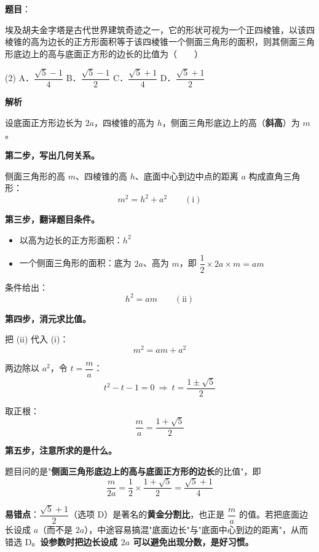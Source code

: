 \begin{answer}

\textbf{题目}：

埃及胡夫金字塔是古代世界建筑奇迹之一，它的形状可视为一个正四棱锥，以该四棱锥的高为边长的正方形面积等于该四棱锥一个侧面三角形的面积，则其侧面三角形底边上的高与底面正方形的边长的比值为\mbox{（　　）}

\begin{gkopts}(2)
\task A．$\dfrac{\sqrt5-1}4$
\task B．$\dfrac{\sqrt5-1}2$
\task C．$\dfrac{\sqrt5+1}4$
\task D．$\dfrac{\sqrt5+1}2$
\end{gkopts}

\textbf{解析}


设底面正方形边长为 $2a$，四棱锥的高为 $h$，侧面三角形底边上的高（\textbf{斜高}）为 $m$。

\textbf{第二步，写出几何关系。}

侧面三角形的高 $m$、四棱锥的高 $h$、底面中心到边中点的距离 $a$ 构成直角三角形：
\nopagebreak[4]
\[m^{2}=h^{2}+a^{2}\qquad(\text{i})\]

\textbf{第三步，翻译题目条件。}

\begin{itemize}
\item 以高为边长的正方形面积：$h^{2}$
\item 一个侧面三角形的面积：底为 $2a$、高为 $m$，即 $\dfrac12\times2a\times m=am$
\end{itemize}

条件给出：
\nopagebreak[4]
\[h^{2}=am\qquad(\text{ii})\]

\textbf{第四步，消元求比值。}

把 (ii) 代入 (i)：
\nopagebreak[4]
\[m^{2}=am+a^{2}\]

两边除以 $a^{2}$，令 $t=\dfrac ma$：
\nopagebreak[4]
\[t^{2}-t-1=0\ \Longrightarrow\ t=\frac{1\pm\sqrt5}2\]

取正根：
\nopagebreak[4]
\[\frac ma=\frac{1+\sqrt5}2\]

\textbf{第五步，注意所求的是什么。}

题目问的是"\textbf{侧面三角形底边上的高与底面正方形的边长}的比值"，即
\nopagebreak[4]
\[\frac m{2a}=\frac12\times\frac{1+\sqrt5}2=\frac{\sqrt5+1}4\]

\begin{gktip}
\textbf{易错点}：$\dfrac{\sqrt5+1}2$（选项 D）是著名的\textbf{黄金分割比}，也正是 $\dfrac ma$ 的值。若把底面边长设成 $a$（而不是 $2a$），中途容易搞混"底面边长"与"底面中心到边的距离"，从而错选 D。\textbf{设参数时把边长设成 $2a$ 可以避免出现分数，是好习惯。}
\end{gktip}


\par\medskip

\end{answer}
